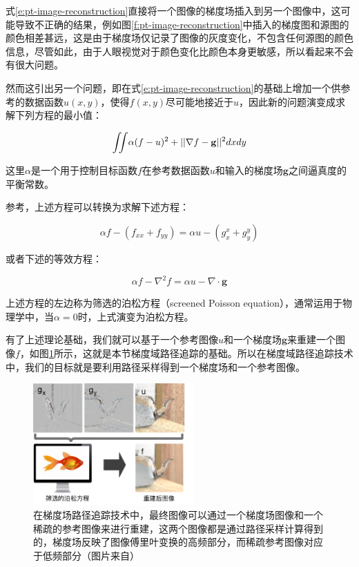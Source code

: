 式\ref{e:pt-image-reconstruction}直接将一个图像的梯度场插入到另一个图像中，这可能导致不正确的结果，例如图\ref{f:pt-image-reconstruction}中插入的梯度图和源图的颜色相差甚远，这是由于梯度场仅记录了图像的灰度变化，不包含任何源图的颜色信息，尽管如此，由于人眼视觉对于颜色变化比颜色本身更敏感，所以看起来不会有很大问题。

然而这引出另一个问题，即在式\ref{e:pt-image-reconstruction}的基础上增加一个供参考的数据函数$u(x,y)$，使得$f(x,y)$尽可能地接近于$u$，因此新的问题演变成求解下列方程的最小值：

\begin{equation}\label{e:screen-poisson-reconstruction}
	{\rm \iint} \alpha (f-u)^2+||\nabla f-\mathbf{g}||^2dxdy
\end{equation}

\noindent 这里$\alpha$是一个用于控制目标函数$f$在参考数据函数$u$和输入的梯度场$\mathbf{g}$之间逼真度的平衡常数。

参考\cite{a:FourierAnalysisofthe2DScreenedPoissonEquationforGradientDomainProblems}，上述方程可以转换为求解下述方程：

\begin{equation}
	\alpha f-(f_{xx}+f_{yy})=\alpha u-(g^{x}_x+g^{y}_y)
\end{equation}

\noindent 或者下述的等效方程：

\begin{equation}
	\alpha f-\nabla^{2}f=\alpha u-\nabla\cdot\mathbf{g}
\end{equation}

\noindent 上述方程的左边称为筛选的泊松方程（screened Poisson equation），通常运用于物理学中，当$\alpha=0$时，上式演变为泊松方程。

有了上述理论基础，我们就可以基于一个参考图像$u$和一个梯度场$\mathbf{g}$来重建一个图像$f$，如图\ref{sec:pt-screened-poisson-equation}所示，这就是本节梯度域路径追踪的基础。所以在梯度域路径追踪技术中，我们的目标就是要利用路径采样得到一个梯度场和一个参考图像。

\begin{figure}
	\sidecaption
	\includegraphics[width=0.55\textwidth]{figures/pt/screened-poisson-equation}
	\caption{在梯度场路径追踪技术中，最终图像可以通过一个梯度场图像和一个稀疏的参考图像来进行重建，这两个图像都是通过路径采样计算得到的，梯度场反映了图像傅里叶变换的高频部分，而稀疏参考图像对应于低频部分（图片来自\cite{a:GradientDomainPathTracing}）}
	\label{sec:pt-screened-poisson-equation}
\end{figure}

